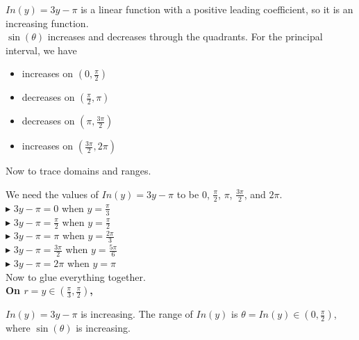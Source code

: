 \documentclass{ximera}
\begin{document}
$In(y) = 3y - \pi$ is a linear function with a positive leading coefficient, so it is an increasing function.\\


$\sin(\theta)$ increases and decreases through the quadrants. For the principal interval, we have


\begin{itemize}
  \item increases on $\left( 0, \frac{\pi}{2} \right)$
  \item decreases on $\left( \frac{\pi}{2}, \pi \right)$
  \item decreases on $\left( \pi, \frac{3\pi}{2} \right)$
  \item increases on $\left( \frac{3\pi}{2}, 2\pi \right)$
\end{itemize}


Now to trace domains and ranges.


We need the values of $In(y) = 3y - \pi$ to be $0$, $\frac{\pi}{2}$, $\pi$, $\frac{3\pi}{2}$, and $2\pi$. \\



$\blacktriangleright$ $3y - \pi = 0$ when $y = \frac{\pi}{3}$ \\

$\blacktriangleright$ $3y - \pi = \frac{\pi}{2}$ when $y = \frac{\pi}{2}$ \\

$\blacktriangleright$ $3y - \pi = \pi$ when $y = \frac{2\pi}{3}$ \\

$\blacktriangleright$ $3y - \pi = \frac{3\pi}{2}$ when $y = \frac{5\pi}{6}$ \\

$\blacktriangleright$ $3y - \pi = 2\pi$ when $y = \pi$ \\





Now to glue everything together. \\



\textbf{\textcolor{purple!80!black}{On $r = y \in \left( \frac{\pi}{3}, \frac{\pi}{2} \right)$, }}



$In(y) = 3y - \pi$ is increasing.  The range of $In(y)$ is $\theta = In(y) \in \left(0, \frac{\pi}{2} \right)$, where $\sin(\theta)$ is increasing. \\
\end{document}
